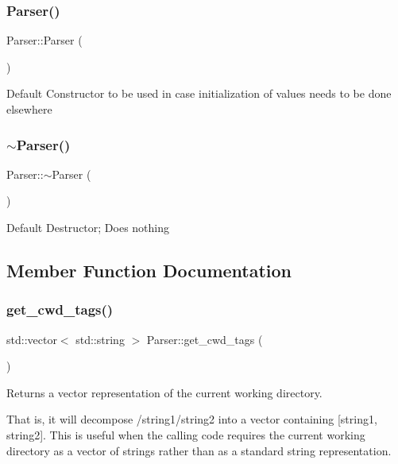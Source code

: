 \subsubsection{\texorpdfstring{Parser()}{Parser()}\hspace{0.1cm}{\footnotesize\ttfamily [4/4]}}
{\footnotesize\ttfamily Parser\+::\+Parser (\begin{DoxyParamCaption}{ }\end{DoxyParamCaption})}

Default Constructor to be used in case initialization of values needs to be done elsewhere \mbox{\label{classParser_a3e658b5917a93a3ef648050d060e3a93}} 
\subsubsection{\texorpdfstring{$\sim$\+Parser()}{~Parser()}}
{\footnotesize\ttfamily Parser\+::$\sim$\+Parser (\begin{DoxyParamCaption}{ }\end{DoxyParamCaption})}

Default Destructor; Does nothing 

\subsection{Member Function Documentation}
\mbox{\label{classParser_aa973764b863dfbe448fa2fd7aa9ffdaa}} 
\subsubsection{\texorpdfstring{get\+\_\+cwd\+\_\+tags()}{get\_cwd\_tags()}}
{\footnotesize\ttfamily std\+::vector$<$ std\+::string $>$ Parser\+::get\+\_\+cwd\+\_\+tags (\begin{DoxyParamCaption}{ }\end{DoxyParamCaption})}



Returns a vector representation of the current working directory. 

That is, it will decompose \textquotesingle{}/string1/string2\textquotesingle{} into a vector containing \mbox{[}string1, string2\mbox{]}. This is useful when the calling code requires the current working directory as a vector of strings rather than as a standard string representation.

